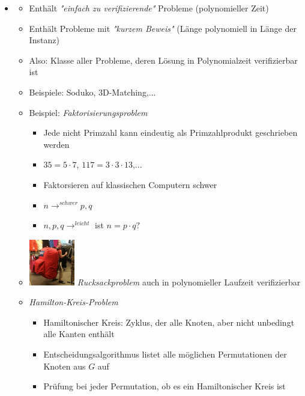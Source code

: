 \documentclass[
    12pt,
    a4paper,
    ngerman,
    color=3b,%
    marginpar=false,
    colorback=false,
    leqno,
]{tudaexercise}
\begin{document}
\begin{itemize}
    \item {}
          \begin{itemize}
              \item Enthält \textit{\string"einfach zu verifizierende\string"} Probleme (polynomieller Zeit)
              \item Enthält Probleme mit \textit{\string"kurzem Beweis\string"} (Länge polynomiell in Länge der Instanz)
              \item Also: Klasse aller Probleme, deren Lösung in Polynomialzeit verifizierbar ist
              \item Beispiele: Soduko, 3D-Matching,...
              \item Beispiel: \textit{Faktorisierungsproblem}
                    \begin{itemize}
                        \item Jede nicht Primzahl kann eindeutig als Primzahlprodukt geschrieben werden
                        \item $35 = 5 \cdot 7$, $117 = 3 \cdot 3 \cdot 13$,...
                        \item Faktorsieren auf klassischen Computern schwer
                        \item $n \longrightarrow^{schwer} p,q$
                        \item $n,p,q \longrightarrow^{leicht}$ ist $n = p \cdot q?$
                    \end{itemize}
              \item \includegraphics[width=2cm]{pictures/rucksackproblem.png} \textit{Rucksackproblem} auch in polynomieller Laufzeit verifizierbar
                    \clearpage
              \item \textit{Hamilton-Kreis-Problem}
                    \begin{itemize}
                        \item Hamiltonischer Kreis: Zyklus, der alle Knoten, aber nicht unbedingt alle Kanten enthält
                        \item Entscheidungsalgorithmus listet alle möglichen Permutationen der Knoten aus $G$ auf
                        \item Prüfung bei jeder Permutation, ob es ein Hamiltonischer Kreis ist

\end{itemize}
\end{itemize}
\end{itemize}
\end{document}
